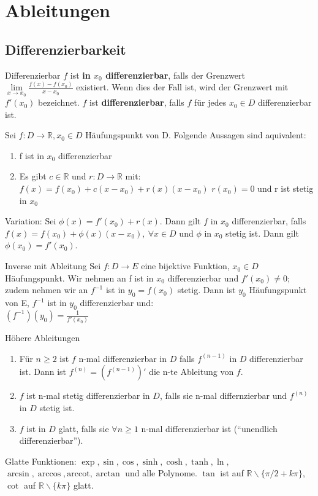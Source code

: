 \documentclass[a4paper,10pt]{article}
\def\R{\mathbb{R}}
\begin{document}
\section{Ableitungen}
\subsection{Differenzierbarkeit}
\begin{mainbox}{Differenzierbar}
 $f$ ist \textbf{in $x_0$ differenzierbar}, falls der Grenzwert $\lim\limits_{x\to x_0} \frac{f(x) - f(x_0)}{x - x_0}$ existiert. Wenn dies der Fall ist, wird der Grenzwert mit $f'(x_0)$ bezeichnet. $f$ ist \textbf{differenzierbar}, falls $f$ für jedes $x_0 \in D$ differenzierbar ist.
\end{mainbox}

Sei $f: D \to \R, x_0 \in D$ Häufungspunkt von D. Folgende Aussagen sind aquivalent:
\begin{enumerate}
  \item f ist in $x_0$ differenzierbar
  \item Es gibt $c \in \R$ und $r: D\to \R$ mit:
    \subitem $f(x) = f(x_0) + c(x-x_0) +r(x)(x-x_0)$
    \subitem $r(x_0) = 0$ und r ist stetig in $x_0$
\end{enumerate}

Variation: Sei $\phi(x) = f'(x_0) + r(x)$. Dann gilt $f$ in $x_0$ differenzierbar, falls $f(x) = f(x_0) + \phi(x) (x-x_0), \ \forall x \in D$ und $\phi$ in $x_0$ stetig ist.
Dann gilt $\phi(x_0) = f'(x_0)$.

\begin{subbox}{Inverse mit Ableitung}
  Sei $f: D\to E$ eine bijektive Funktion, $x_0 \in D$ Häufungspunkt. Wir nehmen an f ist in $x_0$ differenzierbar und $f'(x_0) \neq 0$; zudem nehmen wir an $f^{-1}$ ist in $y_0 = f(x_0)$ stetig. Dann ist $y_0$ Häufungspunkt von E, $f^{-1}$ ist in $y_0$ differenzierbar und:\\ $(f^{-1})(y_0) = \frac{1}{f'(x_0)}$
\end{subbox}

\begin{mainbox}{Höhere Ableitungen}
 \begin{enumerate}
  \item Für $n \ge 2$ ist $f$ n-mal differenzierbar in $D$ falls $f^{(n-1)}$ in $D$ differenzierbar ist. Dann ist $f^{(n)} = (f^{(n-1)})'$ die n-te Ableitung von $f$.
  \item $f$ ist n-mal stetig differenzierbar in $D$, falls sie n-mal differnzierbar und $f^{(n)}$ in $D$ stetig ist.
  \item $f$ ist in $D$ glatt, falls sie $\forall n \ge 1$ n-mal differenzierbar ist (``unendlich differenzierbar'').
 \end{enumerate}
\end{mainbox}
Glatte Funktionen: $\exp, \sin, \cos, \sinh, \cosh, \tanh, \ln,$\\ $ \arcsin, \arccos, \text{arccot}, \arctan$ und alle Polynome. $\tan$ ist auf $\R \backslash \{\pi/2 + k\pi\}$, $\cot$ auf $\R \backslash \{k\pi\}$ glatt.
\end{document}

